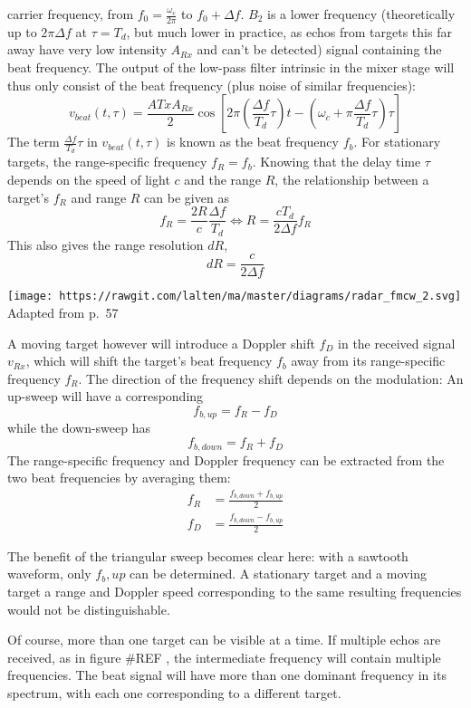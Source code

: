 carrier frequency, from \(f_0 = \frac{\omega_c}{2\pi}\) to
\(f_0 + \Delta f\). \(B_2\) is a lower frequency (theoretically up to
\(2\pi\Delta f\) at \(\tau = T_d\), but much lower in practice, as echos
from targets this far away have very low intensity \(A_{Rx}\) and can't
be detected) signal containing the beat frequency. The output of the
low-pass filter intrinsic in the mixer stage will thus only consist of
the beat frequency (plus noise of similar frequencies): \[
v_{beat}(t,\tau) = \frac{A{Tx}A_{Rx}}{2} \cos \left[ 2\pi\left(\frac{\Delta f}{T_d}\tau\right)t - \left(\omega_c + \pi\frac{\Delta f}{T_d}\tau \right) \tau \right]
\] The term \(\frac{\Delta f}{T_d}\tau\) in \(v_{beat}(t,\tau)\) is
known as the beat frequency \(f_b\). For stationary targets, the
range-specific frequency \(f_R = f_b\). Knowing that the delay time
\(\tau\) depends on the speed of light \(c\) and the range \(R\), the
relationship between a target's \(f_R\) and range \(R\) can be given as
\[
f_R = \frac{2R}{c} \frac{\Delta f}{T_d} \iff R=\frac{c T_d}{2\Delta f}f_R
\] This also gives the range resolution \(dR\), \[
dR = \frac{c}{2 \Delta f}
\]

\texttt{[image: https://rawgit.com/lalten/ma/master/diagrams/radar\_fmcw\_2.svg]}
Adapted from \cite{Adams2012} p.~57

A moving target however will introduce a Doppler shift \(f_D\) in the
received signal \(v_{Rx}\), which will shift the target's beat frequency
\(f_b\) away from its range-specific frequency \(f_R\). The direction of
the frequency shift depends on the modulation: An up-sweep will have a
corresponding \[f_{b,up} = f_R - f_D\] while the down-sweep has
\[f_{b,down} = f_R + f_D\] The range-specific frequency and Doppler
frequency can be extracted from the two beat frequencies by averaging
them: \[
\begin{align}
f_R &= \frac{f_{b,down} + f_{b,up}}{2} \\
f_D &= \frac{f_{b,down} - f_{b,up}}{2}
\end{align}
\]

The benefit of the triangular sweep becomes clear here: with a sawtooth
waveform, only \(f_b,up\) can be determined. A stationary target and a
moving target a range and Doppler speed corresponding to the same
resulting frequencies would not be distinguishable.

Of course, more than one target can be visible at a time. If multiple
echos are received, as in figure \#REF , the intermediate frequency will
contain multiple frequencies. The beat signal will have more than one
dominant frequency in its spectrum, with each one corresponding to a
different target.

